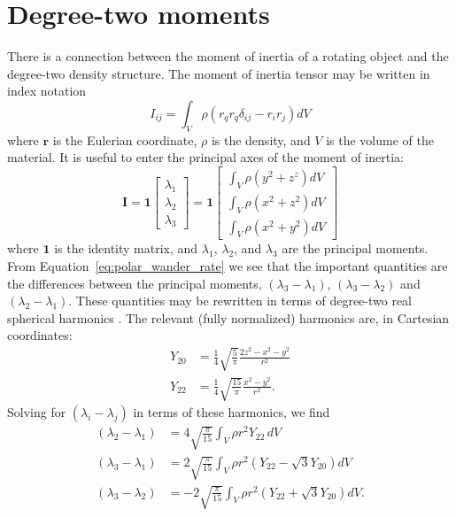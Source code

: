 \documentclass[preprint,12pt,authoryear]{elsarticle}
\begin{document}
\appendix

\section{Degree-two moments}
\label{appendix:moments}

There is a connection between the moment of inertia of a rotating object and the degree-two density structure.
The moment of inertia tensor may be written in index notation
\begin{equation}
I_{ij} = \int_V \rho \left( r_q r_q \delta_{ij} - r_i r_j \right) dV
\label{eq:inertia}
\end{equation}
where $\mathbf{r}$ is the Eulerian coordinate, $\rho$ is the density, and $V$ is the volume of the material.  
It is useful to enter the principal axes of the moment of inertia:
\begin{equation}
\mathbf{I} = \mathbf{1} \begin{bmatrix}
\lambda_1 \\ \lambda_2 \\ \lambda_3
\end{bmatrix} = 
\mathbf{1} \begin{bmatrix}
\int_V \rho (y^2+z^z) dV\\
\int_V \rho (x^2+z^2) dV\\
\int_V \rho (x^2+y^2) dV
\end{bmatrix}
\end{equation}
where $\mathbf{1}$ is the identity matrix, and $\lambda_1$, $\lambda_2$, and $\lambda_3$ are the principal moments.
From Equation~\eqref{eq:polar_wander_rate} we see that the important quantities are the differences between the 
principal moments, $(\lambda_3-\lambda_1)$, $(\lambda_3-\lambda_2)$ and $(\lambda_2-\lambda_1)$.
These quantities may be rewritten in terms of degree-two real spherical harmonics \citep[e.g.][]{dahlen1999theoretical}.
The relevant (fully normalized) harmonics are, in Cartesian coordinates:
\begin{equation}
\begin{aligned}
Y_{20} &= \frac{1}{4} \sqrt{\frac{ 5}{\pi}} \frac{ 2 z^2 - x^2 - y^2}{r^2} \\ 
Y_{22} &= \frac{1}{4} \sqrt{\frac{15}{\pi}} \frac{ x^2 - y^2}{r^2}.
\end{aligned}
\end{equation}
Solving for $( \lambda_i - \lambda_j )$ in terms of these harmonics, we find
\begin{equation}
\begin{aligned}
(\lambda_2 - \lambda_1) &= 4 \sqrt{\frac{\pi}{15} } \int_V   \rho r^2  Y_{22} \,dV \\
(\lambda_3 - \lambda_1) &= 2 \sqrt{ \frac{\pi}{15} } \int_V  \rho r^2 \left( Y_{22} - \sqrt{3} Y_{20} \right) dV \\
(\lambda_3 - \lambda_2) &= -2 \sqrt{ \frac{\pi}{15} } \int_V  \rho r^2 \left( Y_{22} + \sqrt{3} Y_{20} \right) dV. \\
\label{eq:degree_two_moments}
\end{aligned}
\end{equation}
\end{document}
